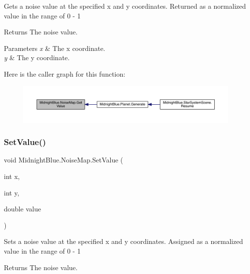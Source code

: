 Gets a noise value at the specified x and y coordinates. Returned as a normalized value in the range of 0 -\/ 1 

\begin{DoxyReturn}{Returns}
The noise value.
\end{DoxyReturn}

\begin{DoxyParams}{Parameters}
{\em x} & The x coordinate.\\
\hline
{\em y} & The y coordinate.\\
\hline
\end{DoxyParams}
Here is the caller graph for this function\+:\nopagebreak
\begin{figure}[H]
\begin{center}
\leavevmode
\includegraphics[width=350pt]{class_midnight_blue_1_1_noise_map_a70d9e8d99e157143eb3d1dbc3895cb9a_icgraph}
\end{center}
\end{figure}
\hypertarget{class_midnight_blue_1_1_noise_map_a26d94cbea4c0377833bed064cbd36496}{}\label{class_midnight_blue_1_1_noise_map_a26d94cbea4c0377833bed064cbd36496} 
\subsubsection{\texorpdfstring{Set\+Value()}{SetValue()}}
{\footnotesize\ttfamily void Midnight\+Blue.\+Noise\+Map.\+Set\+Value (\begin{DoxyParamCaption}\item[{int}]{x,  }\item[{int}]{y,  }\item[{double}]{value }\end{DoxyParamCaption})\hspace{0.3cm}{\ttfamily [inline]}}



Sets a noise value at the specified x and y coordinates. Assigned as a normalized value in the range of 0 -\/ 1 

\begin{DoxyReturn}{Returns}
The noise value.
\end{DoxyReturn}

